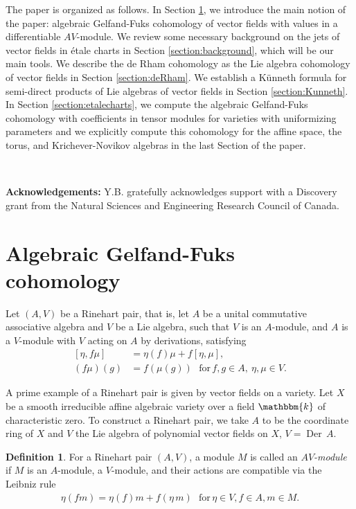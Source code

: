 \documentclass[12pt]{amsart}
\renewcommand{\k}{{\mathbbm{k}}}
\newcommand{\Der}{{\operatorname{Der}}}
\theoremstyle{definition}
\newtheorem{definition}{Definition}[section]
\begin{document}
The paper is organized as follows. In Section \ref{section:GFcohomology}, we introduce the main notion of the paper: algebraic Gelfand-Fuks cohomology of vector fields with values in a differentiable $AV$-module. We review some necessary background on the jets of vector fields in \'etale charts in Section \ref{section:background}, which will be our main tools. We describe the de Rham cohomology as the Lie algebra cohomology of vector fields in Section \ref{section:deRham}. We establish a K\"unneth formula for semi-direct products of Lie algebras of vector fields in Section \ref{section:Kunneth}. In Section \ref{section:etalecharts}, we compute the algebraic Gelfand-Fuks cohomology with coefficients in tensor modules for varieties with uniformizing parameters and we explicitly compute this cohomology for the affine space, the torus, and Krichever-Novikov algebras in the last Section of the paper. 

\

{\bf Acknowledgements:}
Y.B. gratefully acknowledges support with a Discovery grant from the Natural Sciences and Engineering Research Council of Canada. 

\section{Algebraic Gelfand-Fuks cohomology}\label{section:GFcohomology}

Let $(A, V)$ be a Rinehart pair, that is, let $A$ be a unital commutative associative algebra and $V$ be a Lie algebra, such that $V$ is an $A$-module, 
and $A$ is a $V$-module with $V$ acting on $A$ by derivations, satisfying
\begin{align}\label{equation:LieRinehartpair}
[\eta, f \mu] &= \eta(f) \mu + f [\eta, \mu], \\
(f \mu) (g) &= f (\mu(g))
\ \ \ \text{for} \, f, g \in A, \ \eta, \mu \in V.
\end{align}

A prime example of a Rinehart pair is given by vector fields on a variety. 
Let $X$ be a smooth irreducible affine algebraic variety over a field $\k$ of characteristic zero. To construct a Rinehart pair, we take $A$ to be the coordinate ring of $X$ and $V$ the Lie algebra of polynomial vector fields on $X$, $V = \Der\,A$. 

\begin{definition}\label{definition:AVmodules} 
For a Rinehart pair $(A, V)$, a module $M$ is called an \emph{$AV$-module} if $M$ is an $A$-module, a $V$-module, and their actions are compatible via the Leibniz rule
\begin{align}\label{equation:Leibniz}
\eta (f m) = \eta(f) m + f( \eta \,m)
\ \  \ \text{for} \, \eta \in V, f \in A, m \in M.
\end{align}
 
\end{definition}
\end{document}
